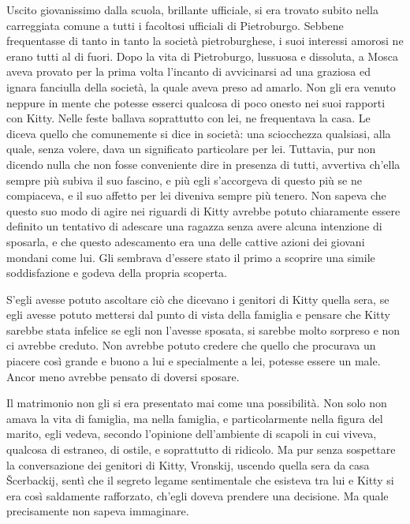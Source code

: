 Uscito giovanissimo dalla scuola, brillante ufficiale, si era trovato subito nella carreggiata comune a tutti i facoltosi ufficiali di Pietroburgo. Sebbene frequentasse di tanto in tanto la società pietroburghese, i suoi interessi amorosi ne erano tutti al di fuori. Dopo la vita di Pietroburgo, lussuosa e dissoluta, a Mosca aveva provato per la prima volta l'incanto di avvicinarsi ad una graziosa ed ignara fanciulla della società, la quale aveva preso ad amarlo. Non gli era venuto neppure in mente che potesse esserci qualcosa di poco onesto nei suoi rapporti con Kitty. Nelle feste ballava soprattutto con lei, ne frequentava la casa. Le diceva quello che comunemente si dice in società: una sciocchezza qualsiasi, alla quale, senza volere, dava un significato particolare per lei. Tuttavia, pur non dicendo nulla che non fosse conveniente dire in presenza di tutti, avvertiva ch'ella sempre più subiva il suo fascino, e più egli s'accorgeva di questo più se ne compiaceva, e il suo affetto per lei diveniva sempre più tenero. Non sapeva che questo suo modo di agire nei riguardi di Kitty avrebbe potuto chiaramente essere definito un tentativo di adescare una ragazza senza avere alcuna intenzione di sposarla, e che questo adescamento era una delle cattive azioni dei giovani mondani come lui. Gli sembrava d'essere stato il primo a scoprire una simile soddisfazione e godeva della propria scoperta. 

S'egli avesse potuto ascoltare ciò che dicevano i genitori di Kitty quella sera, se egli avesse potuto mettersi dal punto di vista della famiglia e pensare che Kitty sarebbe stata infelice se egli non l'avesse sposata, si sarebbe molto sorpreso e non ci avrebbe creduto. Non avrebbe potuto credere che quello che procurava un piacere così grande e buono a lui e specialmente a lei, potesse essere un male. Ancor meno avrebbe pensato di doversi sposare. 

Il matrimonio non gli si era presentato mai come una possibilità. Non solo non amava la vita di famiglia, ma nella famiglia, e particolarmente nella figura del marito, egli vedeva, secondo l'opinione dell'ambiente di scapoli in cui viveva, qualcosa di estraneo, di ostile, e soprattutto di ridicolo. Ma pur senza sospettare la conversazione dei genitori di Kitty, Vronskij, uscendo quella sera da casa Šcerbackij, sentì che il segreto legame sentimentale che esisteva tra lui e Kitty si era così saldamente rafforzato, ch'egli doveva prendere una decisione. Ma quale precisamente non sapeva immaginare. 

